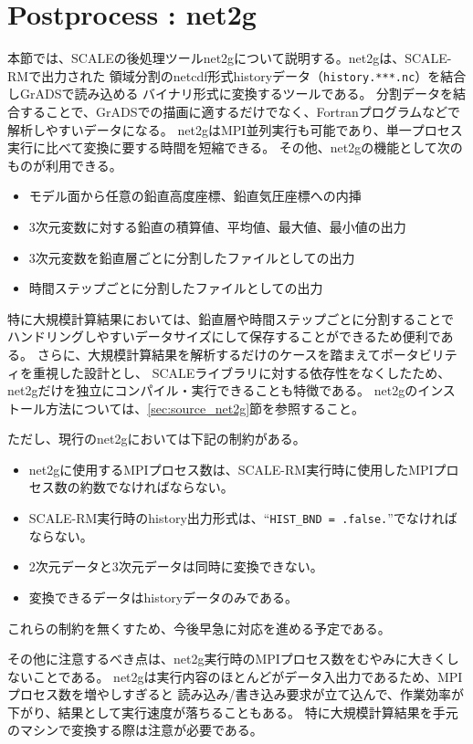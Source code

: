 \section{Postprocess : net2g} \label{sec:net2g}

本節では、SCALEの後処理ツールnet2gについて説明する。net2gは、SCALE-RMで出力された
領域分割のnetcdf形式historyデータ（\verb|history.***.nc|）を結合しGrADSで読み込める
バイナリ形式に変換するツールである。
分割データを結合することで、GrADSでの描画に適するだけでなく、Fortranプログラムなどで
解析しやすいデータになる。
net2gはMPI並列実行も可能であり、単一プロセス実行に比べて変換に要する時間を短縮できる。
その他、net2gの機能として次のものが利用できる。

\begin{itemize}
 \item モデル面から任意の鉛直高度座標、鉛直気圧座標への内挿
 \item 3次元変数に対する鉛直の積算値、平均値、最大値、最小値の出力
 \item 3次元変数を鉛直層ごとに分割したファイルとしての出力
 \item 時間ステップごとに分割したファイルとしての出力
\end{itemize}

特に大規模計算結果においては、鉛直層や時間ステップごとに分割することで
ハンドリングしやすいデータサイズにして保存することができるため便利である。
さらに、大規模計算結果を解析するだけのケースを踏まえてポータビリティを重視した設計とし、
SCALEライブラリに対する依存性をなくしたため、net2gだけを独立にコンパイル・実行できることも特徴である。
net2gのインストール方法については、\ref{sec:source_net2g}節を参照すること。

ただし、現行のnet2gにおいては下記の制約がある。
\begin{itemize}
 \item net2gに使用するMPIプロセス数は、SCALE-RM実行時に使用したMPIプロセス数の約数でなければならない。
 \item SCALE-RM実行時のhistory出力形式は、``\verb|HIST_BND = .false.|''でなければならない。
 \item 2次元データと3次元データは同時に変換できない。
 \item 変換できるデータはhistoryデータのみである。
\end{itemize}
\noindent これらの制約を無くすため、今後早急に対応を進める予定である。

その他に注意するべき点は、net2g実行時のMPIプロセス数をむやみに大きくしないことである。
net2gは実行内容のほとんどがデータ入出力であるため、MPIプロセス数を増やしすぎると
読み込み/書き込み要求が立て込んで、作業効率が下がり、結果として実行速度が落ちることもある。
特に大規模計算結果を手元のマシンで変換する際は注意が必要である。

